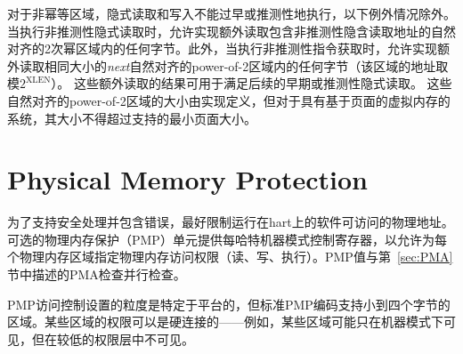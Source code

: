 {\iffalse
For non-idempotent regions, implicit reads and writes must not be performed
early or speculatively, with the following exceptions.
When a non-speculative implicit read is performed, an implementation is
permitted to additionally read any of the bytes within a naturally aligned
power-of-2 region containing the address of the non-speculative implicit read.
Furthermore, when a non-speculative instruction fetch is performed, an
implementation is permitted to additionally read any of the bytes within the
{\em next} naturally aligned power-of-2 region of the same size (with the
address of the region taken modulo $2^{\text{XLEN}}$).
The results of these additional reads may be used to satisfy subsequent early
or speculative implicit reads.
The size of these naturally aligned power-of-2 regions is
implementation-defined, but, for systems with page-based virtual memory, must
not exceed the smallest supported page size.
\fi
对于非幂等区域，隐式读取和写入不能过早或推测性地执行，以下例外情况除外。当执行非推测性隐式读取时，允许实现额外读取包含非推测性隐含读取地址的自然对齐的2次幂区域内的任何字节。此外，当执行非推测性指令获取时，允许实现额外读取相同大小的{\em next}自然对齐的power-of-2区域内的任何字节（该区域的地址取模$2^{\text{XLEN}}$）。
这些额外读取的结果可用于满足后续的早期或推测性隐式读取。
这些自然对齐的power-of-2区域的大小由实现定义，但对于具有基于页面的虚拟内存的系统，其大小不得超过支持的最小页面大小。

\section{Physical Memory Protection}
\label{sec:pmp}

\iffalse
To support secure processing and contain faults, it is desirable to
limit the physical addresses accessible by software running on a hart.
An optional physical memory protection (PMP) unit provides
per-hart machine-mode control registers to allow
physical memory access privileges (read, write, execute) to be
specified for each physical memory region.  The PMP values are checked
in parallel with the PMA checks described in Section~\ref{sec:pma}.
\fi
为了支持安全处理并包含错误，最好限制运行在hart上的软件可访问的物理地址。
可选的物理内存保护（PMP）单元提供每哈特机器模式控制寄存器，以允许为每个物理内存区域指定物理内存访问权限（读、写、执行）。PMP值与第~\ref{sec:PMA}节中描述的PMA检查并行检查。

\iffalse
The granularity of PMP access control settings are platform-specific,
but the standard PMP
encoding supports regions as small as four bytes.  Certain regions' privileges
can be hardwired---for example, some regions might only ever be visible in
machine mode but in no lower-privilege layers.
\fi
PMP访问控制设置的粒度是特定于平台的，但标准PMP编码支持小到四个字节的区域。某些区域的权限可以是硬连接的——例如，某些区域可能只在机器模式下可见，但在较低的权限层中不可见。

}
